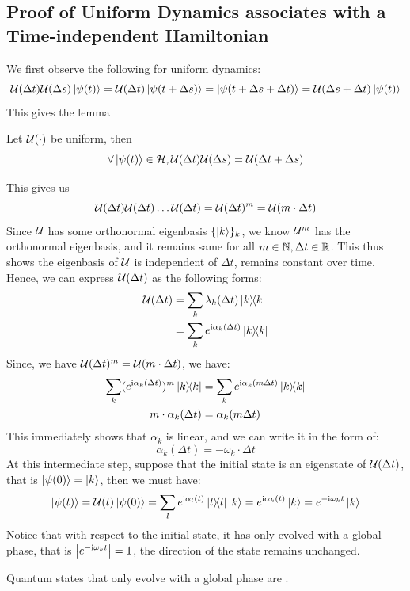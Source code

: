 \subsection{Proof of Uniform Dynamics associates with a Time-independent Hamiltonian}
We first observe the following for uniform dynamics:
$$\mathcal{U}(\Delta t)\mathcal{U}(\Delta s)\ket{\psi(t)} = \mathcal{U}(\Delta t)\ket{\psi(t + \Delta s)} = \ket{\psi(t + \Delta s + \Delta t)} = \mathcal{U}(\Delta s + \Delta t)\ket{\psi(t)}$$
This gives the lemma
\begin{lemma}
    Let $\mathcal{U}(\cdot)$ be uniform, then
    $$\forall \ket{\psi(t)}\in\mathcal{H}, \mathcal{U}(\Delta t)\mathcal{U}(\Delta s) = \mathcal{U}(\Delta t + \Delta s)$$
\end{lemma}
This gives us
$$\mathcal{U}(\Delta t)\mathcal{U}(\Delta t)\dots\mathcal{U}(\Delta t) = \mathcal{U}(\Delta t)^m = \mathcal{U}(m\cdot \Delta t)$$
Since $\mathcal{U}$ has some orthonormal eigenbasis $\{\ket{k}\}_k$, we know $\mathcal{U}^m$ has the  orthonormal eigenbasis, and it remains same for all $m \in \mathbb{N}, \Delta t \in \mathbb{R}$. This thus shows the eigenbasis of $\mathcal{U}$ is independent of $\Delta t$, remains constant over time. Hence, we can express $\mathcal{U}(\Delta t)$ as the following forms:
\begin{align*}
    \opuni(\Delta t) &= \Sumi{k} \lambda_k(\Delta t) \dyad{k} \\
    &= \Sumi{k} e^{\imag \alpha_k(\Delta t)} \dyad{k}
\end{align*}
Since, we have $\mathcal{U}(\Delta t)^m = \mathcal{U}(m\cdot \Delta t)$, we have:
\begin{align*}
    \Sumi{k}(e^{\imag \alpha_k(\Delta t)})^m \dyad{k} &= \Sumi{k} e^{\imag \alpha_k(m\Delta t)} \dyad{k} \\
    m \cdot \alpha_k(\Delta t) &= \alpha_k(m \Delta t)
\end{align*}
This immediately shows that $\alpha_k$ is linear, and we can write it in the form of:
$$\alpha_k(\Delta t) = -\omega_k \cdot \Delta t$$
At this intermediate step, suppose that the initial state is an eigenstate of $\mathcal{U}(\Delta t)$, that is $\ket{\psi(0)} = \ket{k}$, then we must have:
$$\ket{\psi(t)} = \opuni(t)\ket{\psi(0)} = \Sumi{l}e^{\imag \alpha_l(t)}\dyad{l} \ket{k} = e^{\imag \alpha_k(t)}\ket{k} = e^{-\imag \omega_k t}\ket{k}$$
Notice that with respect to the initial state, it has only evolved with a global phase, that is $\abs{e^{-\mathrm{i} \omega_k t}} = 1$, the direction of the state remains unchanged.
\begin{definition}
    Quantum states that only evolve with a global phase are .
\end{definition}
